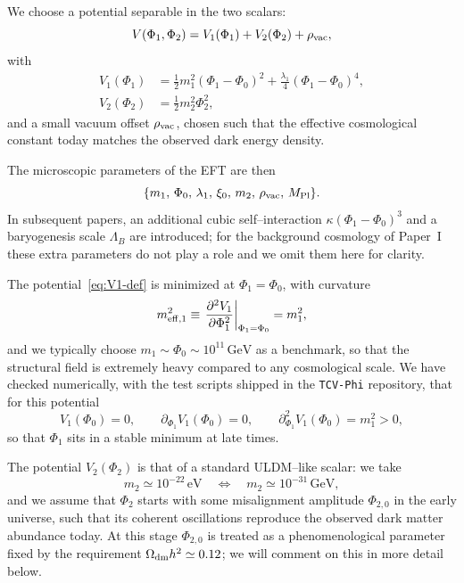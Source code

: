 \documentclass[aps,prd,onecolumn,nofootinbib,superscriptaddress]{revtex4-2}
\newcommand{\Mpl}{M_{\rm Pl}}
\begin{document}
We choose a potential separable in the two scalars:
\begin{equation}
  V(\Phi_1,\Phi_2) = V_1(\Phi_1) + V_2(\Phi_2) + \rho_{\rm vac},
\end{equation}
with
\begin{align}
  V_1(\Phi_1)
  &= \frac{1}{2}m_1^2 (\Phi_1 - \Phi_0)^2
   + \frac{\lambda_1}{4} (\Phi_1 - \Phi_0)^4,
  \label{eq:V1-def}
  \\
  V_2(\Phi_2)
  &= \frac{1}{2}m_2^2 \Phi_2^2,
  \label{eq:V2-def}
\end{align}
and a small vacuum offset $\rho_{\rm vac}$, chosen such that the effective cosmological constant today matches the observed dark energy density.

The microscopic parameters of the EFT are then
\begin{equation}
  \{m_1,\,\Phi_0,\,\lambda_1,\,\xi_0,\,m_2,\,\rho_{\rm vac},\,\Mpl\}.
\end{equation}
In subsequent papers, an additional cubic self--interaction $\kappa(\Phi_1-\Phi_0)^3$ and a baryogenesis scale $\Lambda_B$ are introduced; for the background cosmology of Paper~I these extra parameters do not play a role and we omit them here for clarity.

The potential~\eqref{eq:V1-def} is minimized at $\Phi_1=\Phi_0$, with curvature
\begin{equation}
  m_{\rm eff,1}^2 \equiv \left.\frac{\partial^2 V_1}{\partial\Phi_1^2}\right|_{\Phi_1=\Phi_0}
  = m_1^2,
\end{equation}
and we typically choose $m_1\sim \Phi_0\sim 10^{11}\,\mathrm{GeV}$ as a benchmark, so that the structural field is extremely heavy compared to any cosmological scale.
We have checked numerically, with the test scripts shipped in the \texttt{TCV-Phi} repository, that for this potential
\begin{equation}
  V_1(\Phi_0) = 0,\qquad
  \partial_{\Phi_1} V_1(\Phi_0)=0,\qquad
  \partial^2_{\Phi_1} V_1(\Phi_0) = m_1^2 >0,
\end{equation}
so that $\Phi_1$ sits in a stable minimum at late times.

The potential $V_2(\Phi_2)$ is that of a standard ULDM--like scalar:
we take
\begin{equation}
  m_2 \simeq 10^{-22}\,\mathrm{eV}
  \quad \Longleftrightarrow \quad
  m_2 \simeq 10^{-31}\,\mathrm{GeV},
\end{equation}
and we assume that $\Phi_2$ starts with some misalignment amplitude $\Phi_{2,0}$ in the early universe, such that its coherent oscillations reproduce the observed dark matter abundance today.
At this stage $\Phi_{2,0}$ is treated as a phenomenological parameter fixed by the requirement $\Omega_{\rm dm} h^2\simeq 0.12$; we will comment on this in more detail below.
\end{document}
